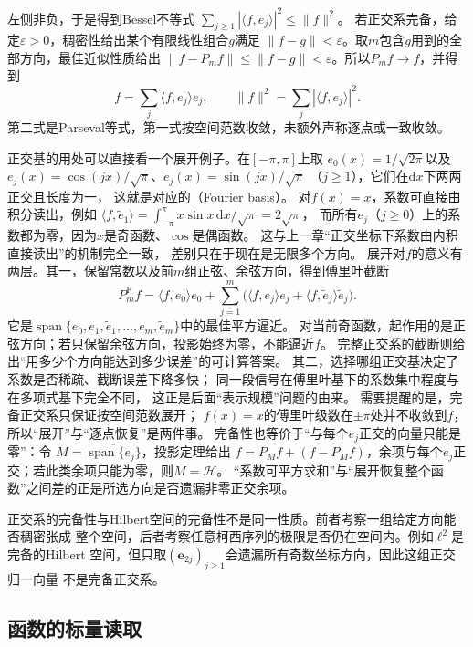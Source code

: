 左侧非负，于是得到Bessel不等式
$\sum_{j\geq1}|\langle f,e_j\rangle|^2\leq\lVert f\rVert^2$。
若正交系完备，给定$\varepsilon>0$，稠密性给出某个有限线性组合$g$满足
$\lVert f-g\rVert<\varepsilon$。取$m$包含$g$用到的全部方向，最佳近似性质给出
$\lVert f-P_mf\rVert\leq\lVert f-g\rVert<\varepsilon$。所以$P_mf\to f$，并得到
\[
 f=\sum_j\langle f,e_j\rangle e_j,\qquad
 \lVert f\rVert^2=\sum_j|\langle f,e_j\rangle|^2.
\]
第二式是Parseval等式，第一式按空间范数收敛，未额外声称逐点或一致收敛。

正交基的用处可以直接看一个展开例子。在$[-\pi,\pi]$上取
$e_0(x)=1/\sqrt{2\pi}$以及$e_j(x)=\cos(jx)/\sqrt{\pi}$、$\tilde e_j(x)=\sin(jx)/\sqrt{\pi}$
（$j\geq1$），它们在$\mathrm dx$下两两正交且长度为一，
这就是对应的（Fourier basis）。
对$f(x)=x$，系数可直接由积分读出，例如
$\langle f,\tilde e_1\rangle=\int_{-\pi}^{\pi}x\sin x\,\mathrm dx/\sqrt\pi=2\sqrt\pi$，
而所有$e_j$（$j\geq0$）上的系数都为零，因为$x$是奇函数、$\cos$是偶函数。
这与上一章“正交坐标下系数由内积直接读出”的机制完全一致，
差别只在于现在是无限多个方向。
展开对$f$的意义有两层。其一，保留常数以及前$m$组正弦、余弦方向，得到傅里叶截断
\[
 P_m^{\mathrm F}f=\langle f,e_0\rangle e_0
 +\sum_{j=1}^m\bigl(\langle f,e_j\rangle e_j
                  +\langle f,\tilde e_j\rangle\tilde e_j\bigr).
\]
它是$\operatorname{span}\{e_0,e_1,\tilde e_1,\ldots,e_m,\tilde e_m\}$中的最佳平方逼近。
对当前奇函数，起作用的是正弦方向；若只保留余弦方向，投影始终为零，不能逼近$f$。
完整正交系的截断则给出“用多少个方向能达到多少误差”的可计算答案。
其二，选择哪组正交基决定了系数是否稀疏、截断误差下降多快；
同一段信号在傅里叶基下的系数集中程度与在多项式基下完全不同，
这正是后面“表示规模”问题的由来。
需要提醒的是，完备正交系只保证按空间范数展开；
$f(x)=x$的傅里叶级数在$\pm\pi$处并不收敛到$f$，
所以“展开”与“逐点恢复”是两件事。
完备性也等价于“与每个$e_j$正交的向量只能是零”：令
$M=\overline{\operatorname{span}\{e_j\}}$，投影定理给出
$f=P_Mf+(f-P_Mf)$，余项与每个$e_j$正交；若此类余项只能为零，则$M=\mathcal H$。
“系数可平方求和”与“展开恢复整个函数”之间差的正是所选方向是否遗漏非零正交余项。

正交系的完备性与Hilbert空间的完备性不是同一性质。前者考察一组给定方向能否稠密张成
整个空间，后者考察任意柯西序列的极限是否仍在空间内。例如$\ell^2$是完备的Hilbert
空间，但只取$(\bm{e}_{2j})_{j\geq1}$会遗漏所有奇数坐标方向，因此这组正交归一向量
不是完备正交系。

\subsection{函数的标量读取}
\label{sec:functional-scalar-readouts}
\label{sec:functional-positive-kernels-rkhs}


